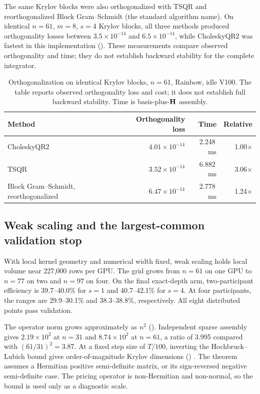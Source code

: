 The same Krylov blocks were also orthogonalized with TSQR and reorthogonalized Block Gram--Schmidt (the standard algorithm name). On identical $n=61$, $m=8$, $s=4$ Krylov blocks, all three methods produced orthogonality losses between $3.5\times10^{-14}$ and $6.5\times10^{-14}$, while CholeskyQR2 was fastest in this implementation (). These measurements compare observed orthogonality and time; they do not establish backward stability for the complete integrator.

\begin{table}[htbp!]
\centering
\caption{Orthogonalization on identical Krylov blocks, $n = 61$, Rainbow, idle V100. The table reports observed orthogonality loss and cost; it does not establish full backward stability. Time is basis-plus-$\mathbf{H}$ assembly.}
\label{tab:ca-orth}
\begin{tabular}{@{}lrrr@{}}
\toprule
\textbf{Method} & \textbf{Orthogonality loss} & \textbf{Time} & \textbf{Relative} \\
\midrule
CholeskyQR2 & $4.01\times10^{-14}$ & 2.248\,ms & 1.00$\times$ \\
TSQR \cite{demmel-2012} & $3.52\times10^{-14}$ & 6.882\,ms & 3.06$\times$ \\
Block Gram--Schmidt, reorthogonalized & $6.47\times10^{-14}$ & 2.778\,ms & 1.24$\times$ \\
\bottomrule
\end{tabular}
\end{table}

\subsection{Weak scaling and the largest-common validation stop}\label{sec:integrator-weak}

With local kernel geometry and numerical width fixed, weak scaling holds local volume near 227{,}000 rows per GPU. The grid grows from $n=61$ on one GPU to $n=77$ on two and $n=97$ on four. On the final exact-depth arm, two-participant efficiency is 39.7--40.0\% for $s=1$ and 40.7--42.1\% for $s=4$. At four participants, the ranges are 29.9--30.1\% and 38.3--38.8\%, respectively. All eight distributed points pass validation.

The operator norm grows approximately as $n^2$ (). Independent sparse assembly gives $2.19\times10^2$ at $n=31$ and $8.74\times10^2$ at $n=61$, a ratio of 3.995 compared with $(61/31)^2=3.87$. At a fixed step size of $T/100$, inverting the Hochbruck--Lubich bound gives order-of-magnitude Krylov dimensions () \cite{hochbruck-lubich-1997}. The theorem assumes a Hermitian positive semi-definite matrix, or its sign-reversed negative semi-definite case. The pricing operator is non-Hermitian and non-normal, so the bound is used only as a diagnostic scale.


